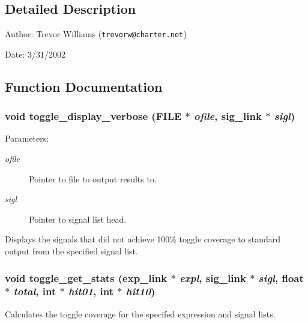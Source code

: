 \subsection{Detailed Description}
\begin{Desc}
\item[Author:]Trevor Williams ({\tt trevorw@charter.net}) \end{Desc}
\begin{Desc}
\item[Date:]3/31/2002\end{Desc}


\subsection{Function Documentation}
\subsubsection{\setlength{\rightskip}{0pt plus 5cm}void toggle\_\-display\_\-verbose (FILE $\ast$ {\em ofile}, {\bf sig\_\-link} $\ast$ {\em sigl})}\label{toggle_8c_a8}


\begin{Desc}
\item[Parameters:]
\begin{description}
\item[{\em ofile}]Pointer to file to output results to. \item[{\em sigl}]Pointer to signal list head.\end{description}
\end{Desc}
Displays the signals that did not achieve 100\% toggle coverage to standard output from the specified signal list. 
\subsubsection{\setlength{\rightskip}{0pt plus 5cm}void toggle\_\-get\_\-stats ({\bf exp\_\-link} $\ast$ {\em expl}, {\bf sig\_\-link} $\ast$ {\em sigl}, float $\ast$ {\em total}, int $\ast$ {\em hit01}, int $\ast$ {\em hit10})}\label{toggle_8c_a5}


Calculates the toggle coverage for the specifed expression and signal lists.

